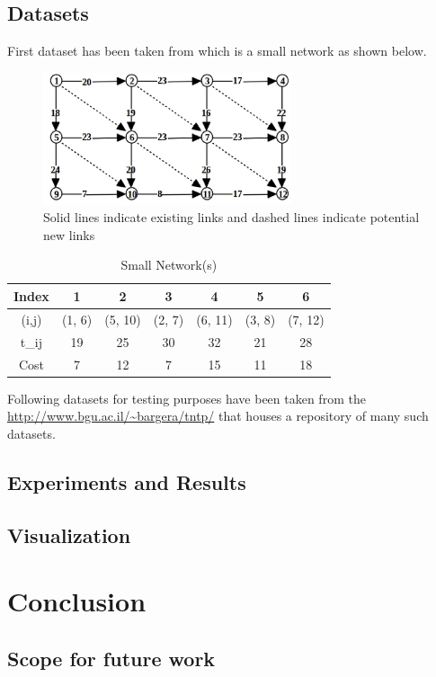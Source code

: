 \documentclass[a4paper, 12pt]{article}
\begin{document}
\subsection{Datasets}
First dataset has been taken from \cite{gao} which is a small network as shown below.\par 
\begin{figure}[h]
\centering
\includegraphics[width=0.65\textwidth]{small.eps}
\vspace{-0.15in}
\caption{Solid lines indicate existing links and dashed lines indicate potential new links}
\label{fig:small}
\end{figure}
\begin{table}[h]
\centering
\begin{tabular}{ |c|c|c|c|c|c|c| }
\hline
Index & 1 & 2 & 3 & 4 & 5 & 6 \\
\hline
(i,j) & (1, 6) & (5, 10) & (2, 7) & (6, 11) & (3, 8) & (7, 12) \\
t_{ij} & 19 & 25 & 30 & 32 & 21 & 28 \\
Cost & 7 & 12 & 7 & 15 & 11 & 18 \\
\hline
\end{tabular}
\caption{Small Network(s)}
\label{table:3}
\end{table}
\noindent
Following datasets for testing purposes have been taken from the \url{http://www.bgu.ac.il/~bargera/tntp/} that houses a repository of many such datasets.
\subsection{Experiments and Results}
\subsection{Visualization}
\newpage
\section{Conclusion}
\subsection{Scope for future work}
\nocite{fontaine,gao,poorzahedy2,tianze,leblanc,kuo,poorzahedy1,wen,andreas,obitko,iitm,bargera,wikipedia}



\end{document}
